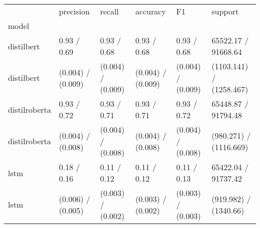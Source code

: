 \begin{tabular}{llllll}
\toprule
{} &          precision &             recall &           accuracy &                 F1 &                  support \\
model         &                    &                    &                    &                    &                          \\
\midrule
distilbert    &        0.93 / 0.69 &        0.93 / 0.68 &        0.93 / 0.68 &        0.93 / 0.68 &      65522.17 / 91668.64 \\
distilbert    &  (0.004) / (0.009) &  (0.004) / (0.009) &  (0.004) / (0.009) &  (0.004) / (0.009) &  (1103.141) / (1258.467) \\
distilroberta &        0.93 / 0.72 &        0.93 / 0.71 &        0.93 / 0.71 &        0.93 / 0.72 &      65448.87 / 91794.48 \\
distilroberta &  (0.004) / (0.008) &  (0.004) / (0.008) &  (0.004) / (0.008) &  (0.004) / (0.008) &   (980.271) / (1116.669) \\
lstm          &        0.18 / 0.16 &        0.11 / 0.12 &        0.11 / 0.12 &        0.11 / 0.13 &      65422.04 / 91737.42 \\
lstm          &  (0.006) / (0.005) &  (0.003) / (0.002) &  (0.003) / (0.002) &  (0.003) / (0.003) &    (919.982) / (1340.66) \\
\bottomrule
\end{tabular}
